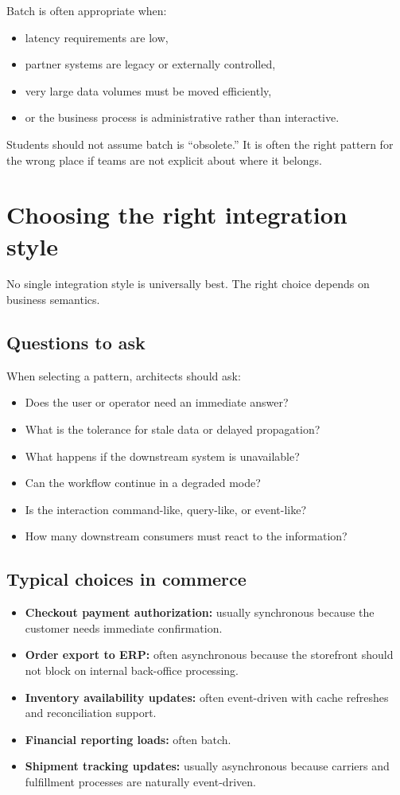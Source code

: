Batch is often appropriate when:
\begin{itemize}
  \item latency requirements are low,
  \item partner systems are legacy or externally controlled,
  \item very large data volumes must be moved efficiently,
  \item or the business process is administrative rather than interactive.
\end{itemize}

Students should not assume batch is ``obsolete.''
It is often the right pattern for the wrong place if teams are not explicit about where it belongs.

\section{Choosing the right integration style}
No single integration style is universally best.
The right choice depends on business semantics.

\subsection{Questions to ask}
When selecting a pattern, architects should ask:
\begin{itemize}
  \item Does the user or operator need an immediate answer?
  \item What is the tolerance for stale data or delayed propagation?
  \item What happens if the downstream system is unavailable?
  \item Can the workflow continue in a degraded mode?
  \item Is the interaction command-like, query-like, or event-like?
  \item How many downstream consumers must react to the information?
\end{itemize}

\subsection{Typical choices in commerce}
\begin{itemize}
  \item \textbf{Checkout payment authorization:} usually synchronous because the customer needs immediate confirmation.
  \item \textbf{Order export to ERP:} often asynchronous because the storefront should not block on internal back-office processing.
  \item \textbf{Inventory availability updates:} often event-driven with cache refreshes and reconciliation support.
  \item \textbf{Financial reporting loads:} often batch.
  \item \textbf{Shipment tracking updates:} usually asynchronous because carriers and fulfillment processes are naturally event-driven.
\end{itemize}

